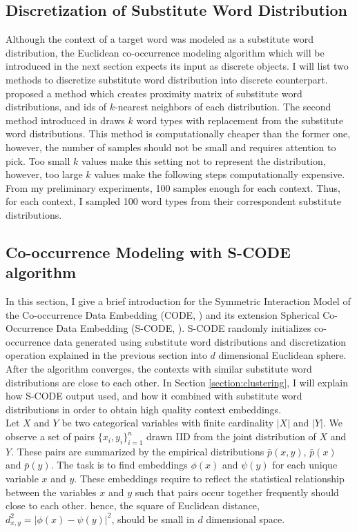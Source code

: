 \subsection{Discretization of Substitute Word Distribution}
\label{section:sampling}

Although the context of a target word was modeled as a substitute word distribution, the Euclidean co-occurrence modeling algorithm which will be introduced in the next section expects its input as discrete objects. I will list two methods to discretize substitute word distribution into discrete counterpart. \cite{sert2013word} proposed a method which creates proximity matrix of substitute word distributions, and  ids of $k$-nearest neighbors of each distribution. The second method introduced in \cite{yatbaz2012learning} draws $k$ word types with replacement from the substitute word distributions. This method is computationally cheaper than the former one, however, the number of samples should not be small and requires attention to pick. Too small $k$ values make this setting not to represent the distribution, however, too large $k$ values make the following steps computationally expensive. From my preliminary  experiments, 100 samples enough for each context. Thus, for each context, I sampled 100 word types from their correspondent substitute distributions.

\subsection{Co-occurrence Modeling with S-CODE algorithm}
\label{section:scode}

In this section, I give a brief introduction for the Symmetric Interaction Model of the Co-occurrence Data Embedding (CODE, \cite{globerson2004euclidean}) and its extension Spherical Co-Occurrence Data Embedding (S-CODE, \cite{Maron2010}). S-CODE randomly initializes co-occurrence data generated using substitute word distributions and discretization operation explained in the previous section into $d$ dimensional Euclidean sphere. After the algorithm converges, the contexts with similar substitute word distributions are close to each other. In Section \ref{section:clustering}, I will explain how S-CODE output used, and how it combined with substitute word distributions in order to obtain high quality context embeddings. \\ 

Let $X$ and $Y$ be two categorical variables with finite cardinality
$|X|$ and $|Y|$.  We observe a set of pairs $\{x_i, y_i\}_{i=1}^n$
drawn IID from the joint distribution of $X$ and $Y$.  These pairs are
summarized by the empirical distributions $\bar{p}(x,y)$, $\bar{p}(x)$
and $\bar{p}(y)$. The task is to find embeddings $\phi(x)$ and
$\psi(y)$ for each unique variable $x$ and $y$. These embeddings require to reflect the statistical relationship between the variables $x$ and $y$ such that pairs occur together frequently should close to each other. hence, the square of Euclidean distance, \mbox{$d^2_{x,y} = |\phi(x) - \psi(y)|^2$}, should be small in $d$ dimensional space. \\

